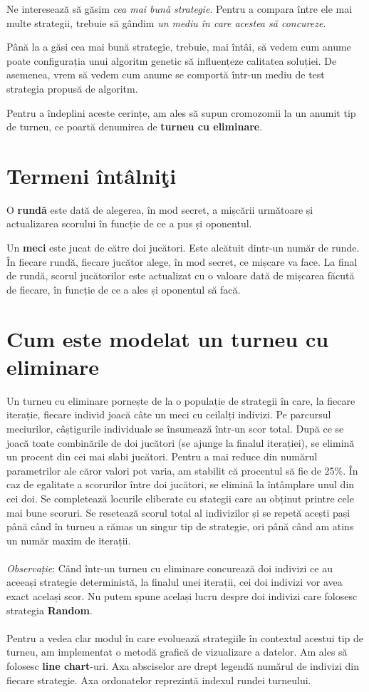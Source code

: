 Ne interesează să găsim \textit{cea mai bună strategie}. Pentru a compara între ele mai multe strategii, trebuie să gândim \textit{un mediu în care acestea să concureze}. 
 
Până la a găsi cea mai bună strategie, trebuie, mai întâi, să vedem cum anume poate configurația unui algoritm genetic să influențeze calitatea soluției. De asemenea, vrem să vedem cum anume se comportă într-un mediu de test strategia propusă de algoritm. 
 
Pentru a îndeplini aceste cerințe, am ales să supun cromozomii la un anumit tip de turneu, ce poartă denumirea de \textbf{turneu cu eliminare}.  

\section {Termeni întâlniţi}
O \textbf{rundă} este dată de alegerea, în mod secret, a mișcării următoare și actualizarea scorului în funcție de ce a pus și oponentul. 

Un \textbf{meci} este jucat de către doi jucători. Este alcătuit dintr-un număr de runde. În fiecare rundă, fiecare jucător alege, în mod secret, ce mișcare va face. La final de rundă, scorul jucătorilor este actualizat cu o valoare dată de mișcarea făcută de fiecare, în funcție de ce a ales și oponentul să facă. 

\section {Cum este modelat un turneu cu eliminare}
 
Un turneu cu eliminare pornește de la o populație de strategii în care, la fiecare iterație, fiecare individ joacă câte un meci cu ceilalți indivizi. Pe parcursul meciurilor, câștigurile individuale se însumează într-un scor total. După ce se joacă toate combinările de doi jucători (se ajunge la finalul iterației), se elimină un procent din cei mai slabi jucători.  Pentru a mai reduce din numărul parametrilor ale căror valori pot varia, am stabilit că procentul să fie de 25\%. În caz de egalitate a scorurilor între doi jucători, se elimină la întâmplare unul din cei doi. Se completează locurile eliberate cu stategii care au obținut printre cele mai bune scoruri. Se resetează scorul total al indivizilor și se repetă acești pași până când în turneu a rămas un singur tip de strategie, ori până când am atins un număr maxim de iterații.  
\\\\
\textit{Observație}: Când într-un turneu cu eliminare concurează doi indivizi ce au aceeași strategie deterministă, la finalul unei iterații, cei doi indivizi vor avea exact același scor. Nu putem spune același lucru despre doi indivizi care folosesc strategia \textbf{Random}.
\\\\
Pentru a vedea clar modul în care evoluează strategiile în contextul acestui tip de turneu, am implementat o metodă grafică de vizualizare a datelor. Am ales să folosesc \textbf{line chart}-uri. Axa absciselor are drept legendă numărul de indivizi din fiecare strategie. Axa ordonatelor reprezintă indexul rundei turneului.


